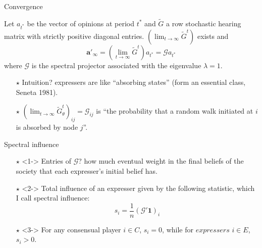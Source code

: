 \documentclass[xcolor=table,handout]{beamer}
\begin{document}
\begin{frame}{Convergence}\label{theorem1}

\begin{tcolorbox}[enhanced,attach boxed title to top center={yshift=-3mm,yshifttext=-1mm}, colback=red!5,colframe=red!40,colbacktitle=red!40 , title=Theorem, fonttitle=\bfseries,  boxed title style={size=small,colframe=red!50} ]
Let $a_{t^{*}}$ be the vector of opinions at period $t^{*}$ and $\tilde{G}$ a row stochastic hearing matrix with strictly positive diagonal entries. $(\lim_{t \rightarrow \infty} \tilde{G}^t)$ exists and  %
  $$\mathbf{a'}_{\infty} = (\lim_{t \rightarrow \infty} \tilde{G}^t) a_{t^{*}} = \mathcal{G} a_{t^{*}}$$ where $\mathcal{G} $ is the spectral projector associated with the eigenvalue $\lambda=1$.
\end{tcolorbox}
\hyperlink{prooftheorem}{}
\pause
\begin{itemize}
\item[$\star$] Intuition?  expressers are like ``absorbing states'' (form an essential class, Seneta 1981).
\item[$\star$] $(\lim_{t \rightarrow \infty} \tilde{G}_{\theta}^t )_{ij} = \mathcal{G}_{ij}$ is ``the probability that a random walk initiated at $i$ is absorbed by node $j$''.  
\end{itemize}
\end{frame}
%
\begin{frame}[noframenumbering]{Spectral influence}

\begin{itemize}
\item[$\star$] <1-> Entries of $\mathcal{G}$? how much eventual weight in the final beliefs of the society that each expresser's initial belief has.  
\item[$\star$]<2-> Total influence of an expresser given by the following statistic, which I call spectral influence: 
\begin{equation*}
s_i = \frac{1}{n} (\mathcal{G}' \mathbf{1} )_{i}
\end{equation*}
\item[$\star$]<3-> {\color{pink} For any consensual player $i \in C$, $s_i = 0$, while for $expressers$ $i \in E$, $s_i > 0$.}

\end{itemize}
\end{frame}
\end{document}
